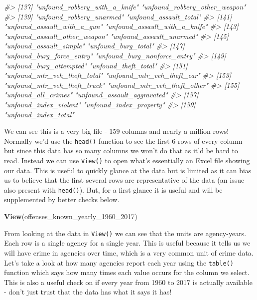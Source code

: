 \documentclass[
  12pt,
]{book}
\newenvironment{Shaded}{\begin{snugshade}}{\end{snugshade}}
\newcommand{\CommentTok}[1]{\textcolor[rgb]{0.37,0.37,0.37}{\textit{#1}}}
\newcommand{\DecValTok}[1]{\textcolor[rgb]{0.06,0.06,0.06}{#1}}
\newcommand{\KeywordTok}[1]{\textcolor[rgb]{0.27,0.27,0.27}{\textbf{#1}}}
\newcommand{\NormalTok}[1]{#1}
\begin{document}
\begin{Shaded}
\begin{Highlighting}[]
\CommentTok{\#\textgreater{} [137] "unfound\_robbery\_with\_a\_knife"   "unfound\_robbery\_other\_weapon"  }
\CommentTok{\#\textgreater{} [139] "unfound\_robbery\_unarmed"        "unfound\_assault\_total"         }
\CommentTok{\#\textgreater{} [141] "unfound\_assault\_with\_a\_gun"     "unfound\_assault\_with\_a\_knife"  }
\CommentTok{\#\textgreater{} [143] "unfound\_assault\_other\_weapon"   "unfound\_assault\_unarmed"       }
\CommentTok{\#\textgreater{} [145] "unfound\_assault\_simple"         "unfound\_burg\_total"            }
\CommentTok{\#\textgreater{} [147] "unfound\_burg\_force\_entry"       "unfound\_burg\_nonforce\_entry"   }
\CommentTok{\#\textgreater{} [149] "unfound\_burg\_attempted"         "unfound\_theft\_total"           }
\CommentTok{\#\textgreater{} [151] "unfound\_mtr\_veh\_theft\_total"    "unfound\_mtr\_veh\_theft\_car"     }
\CommentTok{\#\textgreater{} [153] "unfound\_mtr\_veh\_theft\_truck"    "unfound\_mtr\_veh\_theft\_other"   }
\CommentTok{\#\textgreater{} [155] "unfound\_all\_crimes"             "unfound\_assault\_aggravated"    }
\CommentTok{\#\textgreater{} [157] "unfound\_index\_violent"          "unfound\_index\_property"        }
\CommentTok{\#\textgreater{} [159] "unfound\_index\_total"}
\end{Highlighting}
\end{Shaded}

We can see this is a very big file - 159 columns and nearly a million rows! Normally we'd use the \texttt{head()} function to see the first 6 rows of every column but since this data has so many columns we won't do that as it'd be hard to read. Instead we can use \texttt{View()} to open what's essentially an Excel file showing our data. This is useful to quickly glance at the data but is limited as it can bias us to believe that the first several rows are representative of the data (an issue also present with \texttt{head()}). But, for a first glance it is useful and will be supplemented by better checks below.

\begin{Shaded}
\begin{Highlighting}[]
\KeywordTok{View}\NormalTok{(offenses\_known\_yearly\_}\DecValTok{1960}\NormalTok{\_}\DecValTok{2017}\NormalTok{)}
\end{Highlighting}
\end{Shaded}

From looking at the data in \texttt{View()} we can see that the units are agency-years. Each row is a single agency for a single year. This is useful because it tells us we will have crime in agencies over time, which is a very common unit of crime data. Let's take a look at how many agencies report each year using the \texttt{table()} function which says how many times each value occurs for the column we select. This is also a useful check on if every year from 1960 to 2017 is actually available - don't just trust that the data has what it says it has!
\end{document}
